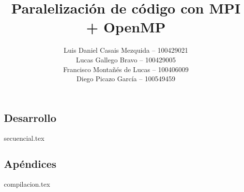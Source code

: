 \documentclass[es]{uc3mreport}
\author{
    Luis Daniel Casais Mezquida -- 100429021\\
    Lucas Gallego Bravo -- 100429005\\
    Francisco Montañés de Lucas -- 100406009\\
    Diego Picazo García -- 100549459
}
\title{Paralelización de código con MPI + OpenMP}
\begin{document}
  \makecover[old]

  \tableofcontents

  \begin{report}


    \part{Desarrollo}
    {secuencial.tex}


  \end{report}



  \begin{appendices}
    \part{Apéndices}  %
    {compilacion.tex}
  \end{appendices}
\end{document}
